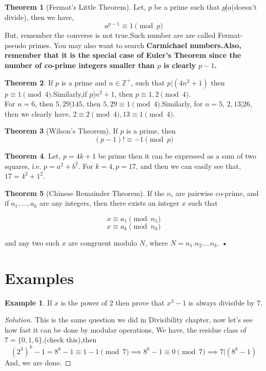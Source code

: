 \documentclass[a4paper,oneside,12 pt]{book}
\theoremstyle{definition}
\newtheorem{exmp}{Example}[section]
\theoremstyle{definition}
\theoremstyle{definition}
\newtheorem{theorem}{Theorem} [section]
\begin{document}
\begin{theorem} [Fermat's Little Theorem]
Let, $p$ be a prime such that $p \not | a$(doesn't divide), then we have,
$$a^{p-1} \equiv 1 \pmod{p}$$
\textsf{But, remember the converse is not true.Such number are are called Fermat-pseudo primes. You may also want to search \textbf{Carmichael numbers.Also, remember that it is the special case of Euler's Theorem since the number of co-prime integers smaller than $p$ is clearly $p-1$.}}

\end{theorem}

\begin{theorem}
If $p$ is a prime and $n \in \mathbb{Z^+}$, such that $p|(4n^2+1)$ then $p \equiv 1 \pmod{4}$.Similarly,if $p|n^2+1$, then $p\equiv 1,2 \pmod{4}$.\\
\textsf{For $n=6$, then $5,29|145$, then $5,29 \equiv 1 \pmod{4}$.Similarly, for $n=5$, $2,13|26$, then we clearly have, $2 \equiv 2 \pmod{4}, 13 \equiv 1\pmod{4}$.}
\end{theorem}

\begin{theorem} [Wilson's Theorem]
If $p$ is a prime, then 
$$(p-1)! \equiv -1 \pmod{p}$$
\end{theorem}

\begin{theorem}
Let, $p=4k+1$ be prime then it can be expressed as a sum of two squares, i.e. $p=a^2+b^2$.
\textsf{For $k=4, p=17$, and then we can easily see that, $17=4^2+1^2$.}
\end{theorem}

\begin{theorem} [Chinese Remainder Theorem]
If the $n_i$ are pairwise co-prime, and if $a_1, ..., a_k$ are any integers, then there exists an integer $x$ such that

$$x \equiv a_{1}\pmod {n_{1}}$$
\center{$${\vdots}$$}
$$x \equiv a_{k}\pmod {n_{k}}$$

and any two such $x$ are congruent modulo $N$, where $N=n_1.n_2....n_k$.
\textsf{•}
\end{theorem}





\newpage
\section{Examples}

\begin{exmp}
If $x$ is the power of $2$ then prove that $x^3-1$ is always divisible by $7$.
\begin{proof}[Solution]
This is the same question we did in Divisibility chapter, now let's see how fast it can be done by modular operations,
We have, the residue class of $7=\{0,1,6\}$,(check this),then
$$(2^3)^k-1=8^k-1 \equiv 1-1 \pmod{7} \implies 8^k-1 \equiv 0 \pmod{7} \implies 7|(8^k-1)$$
And, we are done.
\end{proof}
\end{exmp}
\end{document}
